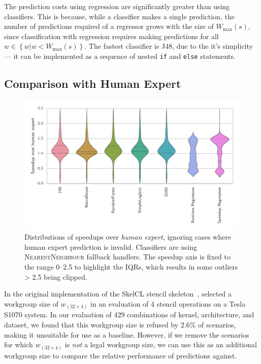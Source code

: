 \documentclass[nonatbib,preprint,10pt]{sigplanconf}
\begin{document}
The prediction costs using regression are significantly greater than
using classifiers. This is because, while a classifier makes a single
prediction, the number of predictions required of a regressor grows
with the size of $W_{\max}(s)$, since classification with regression
requires making predictions for all
$w \in \left\{ w | w < W_{\max}(s) \right\}$. The fastest classifier
is J48, due to the it's simplicity --- it can be implemented as a
sequence of nested \texttt{if} and \texttt{else} statements.


\subsection{Comparison with Human Expert}

\begin{figure}
\centering
\includegraphics[width=\columnwidth]{img/speedup-distributions}
\caption[Speedup results over human expert]{%
  Distributions of speedups over \emph{human expert}, ignoring cases
  where human expert prediction is invalid. Classifiers are using
  \textsc{NearestNeighbour} fallback handlers. The speedup axis is
  fixed to the range 0--2.5 to highlight the IQRs, which results in
  some outliers > 2.5 being clipped.%
}
\label{fig:speedup-distributions}
\end{figure}

In the original implementation of the SkelCL stencil
skeleton~\cite{Breuer2014a}, \citeauthor{Breuer2014a} selected a
workgroup size of $w_{(32 \times 4)}$ in an evaluation of 4 stencil
operations on a Tesla S1070 system. In our evaluation of 429
combinations of kernel, architecture, and dataset, we found that this
workgroup size is refused by 2.6\% of scenarios, making it unsuitable
for use as a baseline. However, if we remove the scenarios for which
$w_{(32 \times 4)}$ is \emph{not} a legal workgroup size, we can use
this as an additional workgroup size to compare the relative
performance of predictions against.
\end{document}
